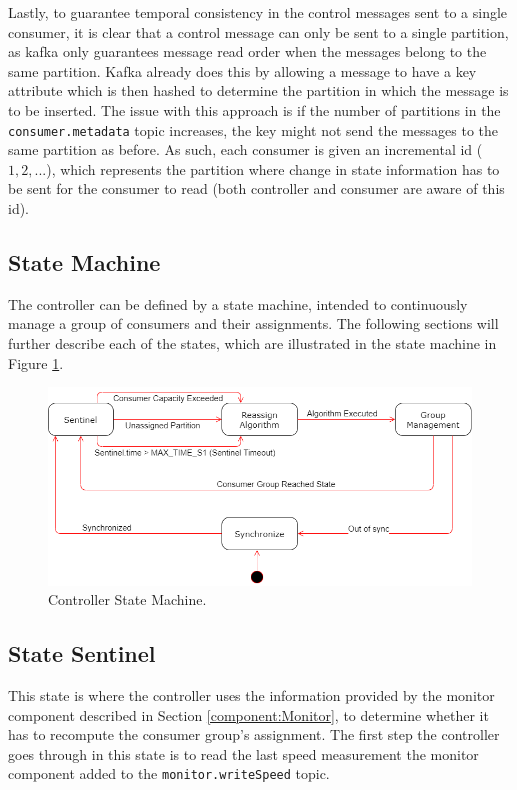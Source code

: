 Lastly, to guarantee temporal consistency in the control messages sent to a
single consumer, it is clear that a control message can only be sent to a single
partition, as kafka only guarantees message read order when the messages belong
to the same partition. Kafka already does this by allowing a message to have a
key attribute which is then hashed to determine the partition in which the
message is to be inserted. The issue with this approach is if the number of
partitions in the \lstinline{consumer.metadata} topic increases, the key might not
send the messages to the same partition as before. As such, each consumer is
given an incremental id ($1, 2, ...$), which represents the partition where
change in state information has to be sent for the consumer to read (both
controller and consumer are aware of this id).

\subsection{State Machine}

The controller can be defined by a state machine, intended to continuously
manage a group of consumers and their assignments. The following sections
will further describe each of the states, which are illustrated in the state
machine in Figure \ref{fig:state_machine}.

\begin{figure}[H] 
\centering
\includegraphics[width=\textwidth]{images/controller/state_machine.png}
\caption{Controller State Machine.} 
\label{fig:state_machine} 
\end{figure}

\subsection{State Sentinel}

This state is where the controller uses the information provided by the monitor
component described in Section \ref{component:Monitor}, to determine whether it
has to recompute the consumer group's assignment. The first step the controller
goes through in this state is to read the last speed measurement the monitor
component added to the \lstinline{monitor.writeSpeed} topic.

